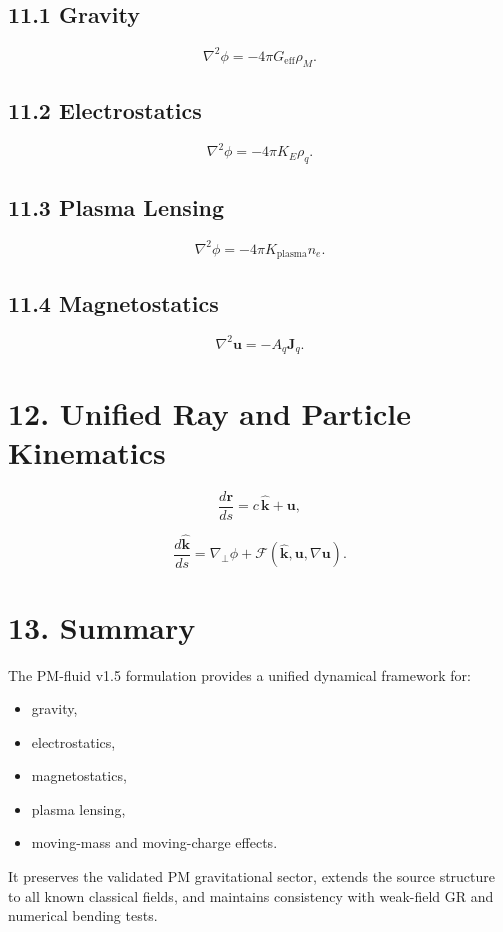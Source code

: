 \documentclass{article}
\begin{document}
\subsection*{11.1 Gravity}


\[
\nabla^2 \phi = -4\pi G_{\mathrm{eff}}\rho_M.
\]



\subsection*{11.2 Electrostatics}


\[
\nabla^2 \phi = -4\pi K_E \rho_q.
\]



\subsection*{11.3 Plasma Lensing}


\[
\nabla^2 \phi = -4\pi K_{\mathrm{plasma}} n_e.
\]



\subsection*{11.4 Magnetostatics}


\[
\nabla^2 \mathbf u = -A_q \mathbf J_q.
\]



\section*{12. Unified Ray and Particle Kinematics}



\[
\frac{d\mathbf r}{ds}
= c\,\hat{\mathbf k}
+ \mathbf u,
\]




\[
\frac{d\hat{\mathbf k}}{ds}
= \nabla_\perp \phi
+ \mathcal{F}(\hat{\mathbf k},\mathbf u,\nabla\mathbf u).
\]



\section*{13. Summary}

The PM-fluid v1.5 formulation provides a unified dynamical framework for:
\begin{itemize}
    \item gravity,
    \item electrostatics,
    \item magnetostatics,
    \item plasma lensing,
    \item moving-mass and moving-charge effects.
\end{itemize}

It preserves the validated PM gravitational sector, extends the source
structure to all known classical fields, and maintains consistency with
weak-field GR and numerical bending tests.
\end{document}
